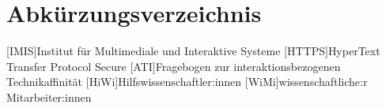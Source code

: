
\cleardoublepage
{}
{}
\chapter*{Abkürzungsverzeichnis}
\label{section-abbrevs}



\begin{acronym}[CoLab]
  [IMIS]{Institut für Multimediale und Interaktive Systeme}
  [HTTPS]{HyperText Transfer Protocol Secure}
  [ATI]{Fragebogen zur interaktionsbezogenen Technikaffinität}
  [HiWi]{Hilfswissenschaftler:innen}
  [WiMi]{wissenschaftliche:r Mitarbeiter:innen}
\end{acronym}
